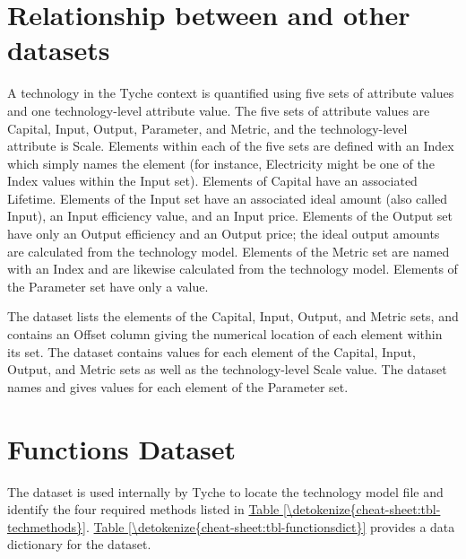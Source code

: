 \documentclass[letterpaper,10pt,english]{sphinxmanual}
\begin{document}
\section{Relationship between  and other datasets}
\label{\detokenize{cheat-sheet:relationship-between-indices-and-other-datasets}}
A technology in the Tyche context is quantified using five sets of attribute values and one technology-level attribute value. The five sets of attribute values are Capital, Input, Output, Parameter, and Metric, and the technology-level attribute is Scale. Elements within each of the five sets are defined with an Index which simply names the element (for instance, Electricity might be one of the Index values within the Input set). Elements of Capital have an associated Lifetime. Elements of the Input set have an associated ideal amount (also called Input), an Input efficiency value, and an Input price. Elements of the Output set have only an Output efficiency and an Output price; the ideal output amounts are calculated from the technology model. Elements of the Metric set are named with an Index and are likewise calculated from the technology model. Elements of the Parameter set have only a value.

The  dataset lists the elements of the Capital, Input, Output, and Metric sets, and contains an Offset column giving the numerical location of each element within its set. The  dataset contains values for each element of the Capital, Input, Output, and Metric sets as well as the technology-level Scale value. The  dataset names and gives values for each element of the Parameter set.


\section{Functions Dataset}
\label{\detokenize{cheat-sheet:functions-dataset}}
The  dataset is used internally by Tyche to locate the technology model file and identify the four required methods listed in \hyperref[\detokenize{cheat-sheet:tbl-techmethods}]{Table \ref{\detokenize{cheat-sheet:tbl-techmethods}}}. \hyperref[\detokenize{cheat-sheet:tbl-functionsdict}]{Table \ref{\detokenize{cheat-sheet:tbl-functionsdict}}} provides a data dictionary for the  dataset.
\end{document}

